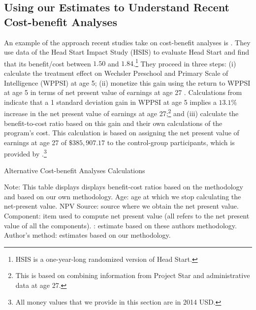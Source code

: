 



\subsection{Using our Estimates to Understand Recent Cost-benefit Analyses}

\noindent An example of the approach recent studies take on cost-benefit analyses is \citet{Kline-Walters_2016_QJE}. They use data of the Head Start Impact Study (HSIS) to evaluate Head Start and find that its benefit/cost between $1.50$ and $1.84$.\footnote{HSIS is a one-year-long randomized version of Head Start.} They proceed in three steps: (i) calculate the treatment effect on Wechsler Preschool and Primary Scale of Intelligence (WPPSI) at age 5; (ii) monetize this gain using the return to WPPSI at age 5 in terms of net present value of earnings at age 27 \citep{Chetty_Friedman_etal_2011_QJoE}. Calculations from \citet{Chetty_Friedman_etal_2011_QJoE} indicate that a 1 standard deviation gain in WPPSI at age 5 implies a $13.1\%$ increase in the net present value of earnings at age 27;\footnote{This is based on combining information from Project Star and administrative data at age 27.} and (iii) calculate the benefit-to-cost ratio based on this gain and their own calculations of the program's cost. This calculation is based on assigning the net present value of earnings at age 27 of $\$385,907.17$ to the control-group participants, which is provided by  \citet{Chetty_Friedman_etal_2011_QJoE}.\footnote{All money values that we provide in this section are in 2014 USD.}\\


\begin{table}[H] 
\begin{threeparttable}
\caption{Alternative Cost-benefit Analyses Calculations}
\label{table:comparing}
\centering 
\footnotesize

\begin{tablenotes}
\footnotesize
\item Note: This table displays displays benefit-cost ratios based on the methodology \citet{Kline-Walters_2016_QJE} and based on our own methodology. Age: age at which we stop calculating the net-present value. NPV Source: source where we obtain the net present value. Component: item used to compute net present value (all refers to the net present value of all the components). \citet{Kline-Walters_2016_QJE}: estimate based on these authors methodology. Author's method: estimates based on our methodology.
\end{tablenotes}
\end{threeparttable}
\end{table}

